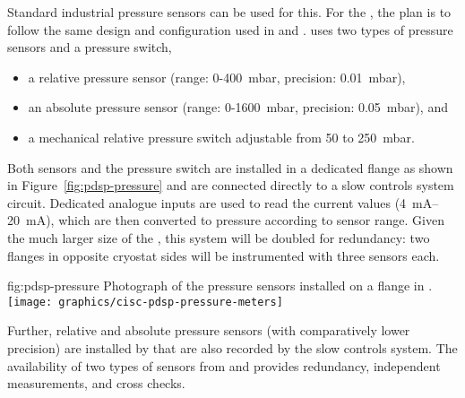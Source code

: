 Standard industrial pressure sensors can be used for this. For the  , the plan is to follow the same design and configuration used in  and .  uses two types of pressure sensors and a pressure switch, %
\begin{itemize}
    \item a relative pressure sensor (range: 0-400~mbar, precision: 0.01~mbar),
    \item an absolute pressure sensor (range: 0-1600~mbar, precision: 0.05~mbar), and
    \item a mechanical relative pressure switch adjustable from 50 to 250~mbar. 
\end{itemize}


Both sensors and the pressure switch are installed in a dedicated flange as shown in Figure~\ref{fig:pdsp-pressure} and are connected directly to a slow controls system  circuit. Dedicated analogue inputs are used to read the current values (\SIrange{4}{20}{mA}), which are then converted to pressure according to sensor range. Given the much larger size of the  , this system will be doubled for redundancy: two flanges in opposite cryostat sides will be instrumented with three sensors each. 

\begin{dunefigure}{fig:pdsp-pressure}
  {Photograph of the pressure sensors installed on a flange in .}
  \texttt{[image: graphics/cisc-pdsp-pressure-meters]}
\end{dunefigure}

Further, relative and absolute pressure sensors (with comparatively lower precision) are installed by  that are also recorded by the slow controls system. The availability of two types of sensors from  and  provides redundancy, independent measurements, and cross checks.

